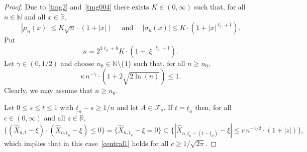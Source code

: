 \documentclass[11pt]{amsart}
\newcommand{\R}{{\mathbb R}}
\newcommand{\N}{{\mathbb N}}
\newcommand{\utn}{\underline {t}_n}
\newcommand{\F}{{\mathcal F}}
\theoremstyle{plain}
\theoremstyle{definition}
\begin{document}
\begin{proof}
Due to \eqref{tmg2} and~\eqref{tmg004} there exists $K\in (0,\infty)$ such that, for all $n\in\N$ and all $x\in\R$,
\begin{equation}\label{tmgX1}
|\mu_n(x)|\le K \sqrt{n} \cdot(1+|x|)\quad\text{ and }\quad |\sigma_n(x)| \le K\cdot (1+|x|^{\ell_\sigma+1}).
\end{equation}
Put
\[
\kappa=2^{3\ell_\sigma+8}K\cdot  (1+|\xi|^{\ell_\sigma+1}).
\]
Let $\gamma \in (0,1/2)$ and
choose $n_0\in\N\setminus\{1\}$
such that, for all $n \geq n_0$,
\[
\kappa\,n^{-\gamma}\cdot  (1+2\sqrt{2\ln(n)}) \leq 1.
\]
Clearly, we may assume that $n\ge n_0$.

Let $ 0\le s\le t \le 1$ with $\utn-s \ge 1/n$ and let $A\in \F_s$.
If $t=\utn$ then, for all $c\in (0,\infty)$ and all $z\in\R$,
\[
 \{(\widehat X_{n,t}-\xi) \cdot(\widehat X_{n,\utn}-\xi)\le 0\} =  \{\widehat X_{n,\utn}-\xi = 0\} \subset  \bigl\{|\widehat X_{n,\utn-(t-\utn)}-\xi| \le c\,n^{-1/2} \cdot(1+|z|)\bigr\},
\]
which implies that in this case~\eqref{central1} holds for all $c\ge 1/\sqrt{2\pi}$.


\end{proof}
\end{document}
